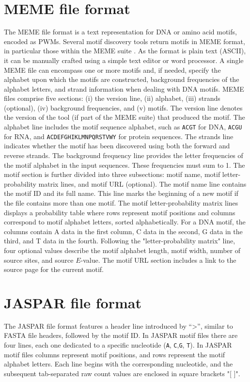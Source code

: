 \documentclass[a4paper, titlepage, openright]{book}
\begin{document}
\section{MEME file format}\label{section:meme-format}
The MEME file format \citep{bailey2009meme} is a text representation for DNA or amino acid motifs, encoded as PWMs. Several motif discovery tools return motifs in MEME format, in particular those within the MEME suite \citep{bailey2009meme}. As the format is plain text (ASCII), it can be manually crafted using a simple text editor or word processor. A single MEME file can encompass one or more motifs and, if needed, specify the alphabet upon which the motifs are constructed, background frequencies of the alphabet letters, and strand information when dealing with DNA motifs. MEME files comprise five sections: (i) the version line, (ii) alphabet, (iii) strands (optional), (iv) background frequencies, and (v) motifs. The version line denotes the version of the tool (if part of the MEME suite) that produced the motif. The alphabet line includes the motif sequence alphabet, such as \texttt{ACGT} for DNA, \texttt{ACGU} for RNA, and \texttt{ACDEFGHIKLMNPQRSTVWY} for protein sequences. The strands line indicates whether the motif has been discovered using both the forward and reverse strands. The background frequency line provides the letter frequencies of the motif alphabet in the input sequences. These frequencies must sum to 1. The motif section is further divided into three subsections: motif name, motif letter-probability matrix lines, and motif URL (optional). The motif name line contains the motif ID and its full name. This line marks the beginning of a new motif if the file contains more than one motif. The motif letter-probability matrix lines displays a probability table where rows represent motif positions and columns correspond to motif alphabet letters, sorted alphabetically. For a DNA motif, the columns contain A data in the first column, C data in the second, G data in the third, and T data in the fourth. Following the "letter-probability matrix" line, four optional values describe the motif alphabet length, motif width, number of source sites, and source $E$-value. The motif URL section includes a link to the source page for the current motif.

\section{JASPAR file format}\label{section:jaspar-format}
The JASPAR file format \citep{sandelin2004jaspar} features a header line introduced by ``>'', similar to FASTA file headers, followed by the motif ID. In JASPAR motif files there are four lines, each one dedicated to a specific nucleotide (\texttt{A}, \texttt{C},\texttt{G}, \texttt{T}). In JASPAR motif files columns represent motif positions, and rows represent the motif alphabet letters. Each line begins with the corresponding nucleotide, and the subsequent tab-separated raw count values are enclosed in square brackets "[ ]".
\end{document}
